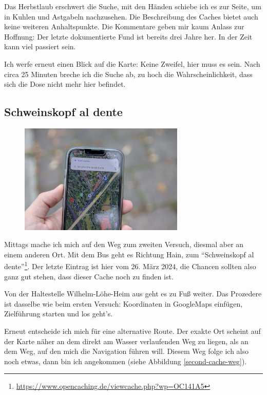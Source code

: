 Das Herbstlaub erschwert die Suche, mit den Händen schiebe ich es zur Seite, um in Kuhlen und Astgabeln nachzusehen. Die Beschreibung des Caches bietet auch keine weiteren Anhaltspunkte. Die Kommentare geben mir kaum Anlass zur Hoffnung: Der letzte dokumentierte Fund ist bereits drei Jahre her. In der Zeit kann viel passiert sein.

Ich werfe erneut einen Blick auf die Karte: Keine Zweifel, hier muss es sein. Nach circa 25 Minuten breche ich die Suche ab, zu hoch die Wahrscheinlichkeit, dass sich die Dose nicht mehr hier befindet.

\subsection*{Schweinskopf al dente}

\begin{figure}[H]
    \centering
    \includegraphics[width=0.7\textwidth]{figures/geocaching/second/IMG_3105.jpg}
\end{figure}


Mittags mache ich mich auf den Weg zum zweiten Versuch, diesmal aber an einem anderen Ort. Mit dem Bus geht es Richtung Hain, zum \enquote{Schweinskopf al dente}\footnote{\url{https://www.opencaching.de/viewcache.php?wp=OC141A5}}. Der letzte Eintrag ist hier vom 26. März 2024, die Chancen sollten also ganz gut stehen, dass dieser Cache noch zu finden ist.

Von der Haltestelle Wilhelm-Löhe-Heim aus geht es zu Fuß weiter. Das Prozedere ist dasselbe wie beim ersten Versuch: Koordinaten in GoogleMaps einfügen, Zielführung starten und los geht's.

Erneut entscheide ich mich für eine alternative Route. Der exakte Ort scheint auf der Karte näher an dem direkt am Wasser verlaufenden Weg zu liegen, als an dem Weg, auf den mich die Navigation führen will. Diesem Weg folge ich also noch etwas, dann bin ich angekommen (siehe Abbildung \ref{second-cache-weg}).

